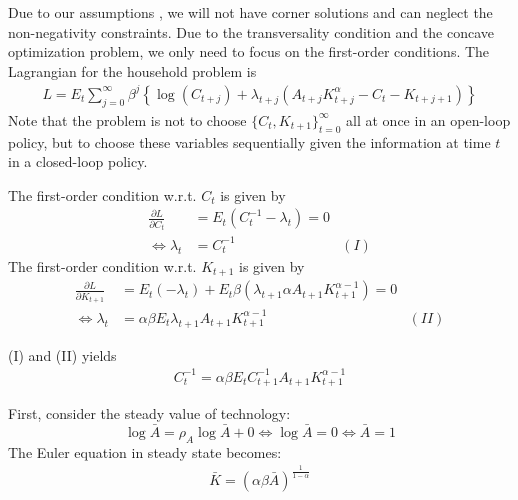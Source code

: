 \begin{Solution}{1}
		Due to our assumptions , we will not have corner solutions and can neglect the non-negativity constraints. Due to the transversality condition and the concave optimization problem, we only need to focus on the first-order conditions.
		The Lagrangian for the household problem is
		\begin{align*}
		L = E_t\sum_{j=0}^{\infty}\beta^j\left\{\log(C_{t+j}) + \lambda_{t+j} \left(A_{t+j}K_{t+j}^\alpha -C_t - K_{t+j+1}\right)\right\}
		\end{align*}
		Note that the problem is not to choose $\{C_t,K_{t+1}\}_{t=0}^\infty$ all at once in an open-loop policy, but to choose these variables sequentially given the information at time $t$ in a closed-loop policy.

		The first-order condition w.r.t. $C_t$ is given by
		\begin{align*}
		\frac{\partial L}{\partial C_{t}} &= E_t \left(C_t^{-1}-\lambda_{t}\right) = 0\\
		\Leftrightarrow \lambda_{t} &= C_{t}^{-1} & (I)
		\end{align*}
		The first-order condition w.r.t. $K_{t+1}$ is given by
		\begin{align*}
		\frac{\partial L}{\partial K_{t+1}} &= E_t (-\lambda_{t}) +
		E_t \beta \left(\lambda_{t+1}\alpha A_{t+1} K_{t+1}^{\alpha-1}\right) = 0\\
		\Leftrightarrow \lambda_{t} &= \alpha\beta E_t \lambda_{t+1}A_{t+1} K_{t+1}^{\alpha-1} & (II)
		\end{align*}

		(I) and (II) yields
		\begin{align*}
		C_t^{-1} = \alpha\beta E_t C_{t+1}^{-1} A_{t+1} K_{t+1}^{\alpha-1}
		\end{align*}
	
\end{Solution}
\begin{Solution}{2}
		First, consider the steady value of technology:
		$$\log\bar{A}=\rho_A \log\bar{A} + 0 \Leftrightarrow \log\bar{A} = 0 \Leftrightarrow \bar{A} = 1$$
		The Euler equation in steady state becomes:
		\begin{align*}
		\bar{K} = (\alpha \beta \bar{A})^{\frac{1}{1-\alpha}}
		\end{align*}
	
\end{Solution}
